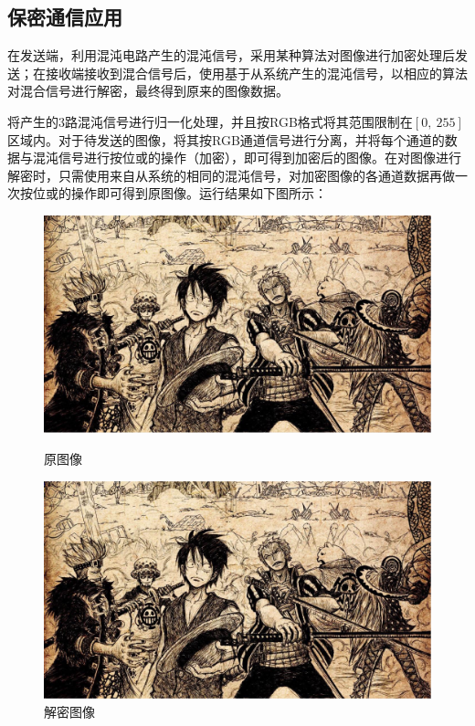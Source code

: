 \documentclass[UTF8]{article}
\begin{document}
\subsection{保密通信应用}

在发送端，利用混沌电路产生的混沌信号，采用某种算法对图像进行加密处理后发送；在接收端接收到混合信号后，使用基于从系统产生的混沌信号，以相应的算法对混合信号进行解密，最终得到原来的图像数据。

将产生的3路混沌信号进行归一化处理，并且按RGB格式将其范围限制在$[0,\ 255]$区域内。对于待发送的图像，将其按RGB通道信号进行分离，并将每个通道的数据与混沌信号进行按位或的操作（加密），即可得到加密后的图像。在对图像进行解密时，只需使用来自从系统的相同的混沌信号，对加密图像的各通道数据再做一次按位或的操作即可得到原图像。运行结果如下图所示：
\begin{figure}[htbp]
	\centering
	\begin{minipage}{0.49\linewidth}
		\centering
		\includegraphics[width=0.9\linewidth]{figure/混沌电路-原图像.png}
		\caption{原图像}
	\end{minipage}
	\begin{minipage}{0.49\linewidth}
		\centering
		\includegraphics[width=0.9\linewidth]{figure/混沌电路-解密图像.png}
		\caption{解密图像}
	\end{minipage}
\end{figure}
\end{document}
